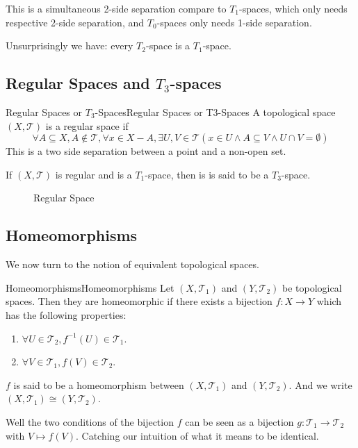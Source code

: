 \documentclass[../main.tex]{subfiles}
\begin{document}
This is a simultaneous 2-side separation compare to $T_1$-spaces, which only needs respective 2-side separation, and $T_0$-spaces only needs 1-side separation.

Unsurprisingly we have: every $T_2$-space is a $T_1$-space.

\subsection{Regular Spaces and $T_3$-spaces}
\begin{definition}{Regular Spaces or $T_3$-Spaces}{Regular Spaces or T3-Spaces}
A topological space $(X,\mathcal{T})$ is a regular space if
\begin{equation*}
\forall A \subseteq X, A\notin \mathcal{T}, \forall x\in X-A, \exists U,V\in \mathcal{T} (x\in U \land A \subseteq V \land U\cap V = \emptyset )
\end{equation*}
This is a two side separation between a point and a non-open set.

If $(X,\mathcal{T})$ is regular and is a $T_1$-space, then is is said to be a $T_3$-space.
\end{definition}
\begin{figure}[H]
    \centering
    \caption{Regular Space}
    \label{fig:regular-space}
\end{figure}

\subsection{Homeomorphisms}
We now turn to the notion of equivalent topological spaces.

\begin{definition}{Homeomorphisms}{Homeomorphisms}
Let $(X,\mathcal{T}_1)$ and $(Y,\mathcal{T}_2)$ be topological spaces. Then they are homeomorphic if there exists a bijection $f:X \rightarrow Y$ which has the following properties: 
\begin{enumerate}
	\item $\forall U\in \mathcal{T}_2, f^{-1}(U) \in \mathcal{T}_1$.
	\item $\forall V\in \mathcal{T}_1, f(V) \in \mathcal{T}_2$.
\end{enumerate}
$f$ is said to be a homeomorphism between $(X,\mathcal{T}_1)$ and $(Y,\mathcal{T}_2)$. And we write $(X,\mathcal{T}_1) \cong (Y,\mathcal{T}_2)$.
\end{definition}
Well the two conditions of the bijection $f$ can be seen as a bijection $g: \mathcal{T}_1 \rightarrow  \mathcal{T}_2$ with $V \mapsto f(V)$. Catching our intuition of what it means to be identical.
\end{document}
